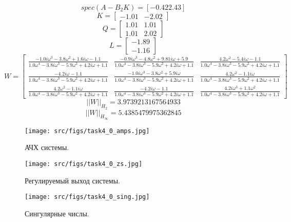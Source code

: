 \[spec(A-B_2 K) = [-0.42  2.43]\]
\[K = \begin{bmatrix}
 -1.01 & -2.02
\end{bmatrix}\]
\[Q = \begin{bmatrix}
  1.01 &  1.01\\
  1.01 &  2.02
\end{bmatrix}\]
\[L = \begin{bmatrix}
    -1.89\\
    -1.16
   \end{bmatrix}\]
\[ W = \left[\begin{matrix}\frac{- 1.0 i \omega^{3} - 3.8 \omega^{2} + 1.6 i \omega - 1.1}{1.0 \omega^{4} - 3.8 i \omega^{3} - 5.9 \omega^{2} + 4.2 i \omega + 1.1} & \frac{- 0.9 i \omega^{3} - 4.8 \omega^{2} + 9.81 i \omega + 5.9}{1.0 \omega^{4} - 3.8 i \omega^{3} - 5.9 \omega^{2} + 4.2 i \omega + 1.1} & \frac{4.2 \omega^{2} - 5.4 i \omega - 1.1}{1.0 \omega^{4} - 3.8 i \omega^{3} - 5.9 \omega^{2} + 4.2 i \omega + 1.1}\\\frac{- 4.2 i \omega - 1.1}{1.0 \omega^{4} - 3.8 i \omega^{3} - 5.9 \omega^{2} + 4.2 i \omega + 1.1} & \frac{- 1.0 i \omega^{3} - 3.8 \omega^{2} + 5.9 i \omega}{1.0 \omega^{4} - 3.8 i \omega^{3} - 5.9 \omega^{2} + 4.2 i \omega + 1.1} & \frac{4.2 \omega^{2} - 1.1 i \omega}{1.0 \omega^{4} - 3.8 i \omega^{3} - 5.9 \omega^{2} + 4.2 i \omega + 1.1}\\\frac{4.2 \omega^{2} - 1.1 i \omega}{1.0 \omega^{4} - 3.8 i \omega^{3} - 5.9 \omega^{2} + 4.2 i \omega + 1.1} & \frac{- 4.2 i \omega - 1.1}{1.0 \omega^{4} - 3.8 i \omega^{3} - 5.9 \omega^{2} + 4.2 i \omega + 1.1} & \frac{4.2 i \omega^{3} + 1.1 \omega^{2}}{1.0 \omega^{4} - 3.8 i \omega^{3} - 5.9 \omega^{2} + 4.2 i \omega + 1.1}\end{matrix}\right] \]
\[||W||_{H_2} = 3.9739213167564933\]
\[||W||_{H_\infty} = 5.4385479975362845 \]

\begin{figure}[ht!]
    \centering
    \texttt{[image: src/figs/task4\_0\_amps.jpg]}
    \caption{АЧХ системы.}
    \label{fig:task4_0_amps}
  \end{figure}
  
  \begin{figure}[ht!]
    \centering
    \texttt{[image: src/figs/task4\_0\_zs.jpg]}
    \caption{Регулируемый выход системы.}
    \label{fig:task4_0_zs}
  \end{figure}
  
  \begin{figure}[ht!]
    \centering
    \texttt{[image: src/figs/task4\_0\_sing.jpg]}
    \caption{Сингулярные числы.}
    \label{fig:task4_0_sing}
  \end{figure}

